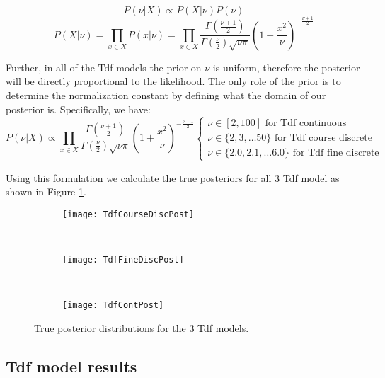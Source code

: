\[P(\nu|X) \propto P(X|\nu)P(\nu)\]
\[P(X|\nu) = \prod_{x \in X} P(x|\nu) = \prod_{x \in X} \frac{\Gamma \left( \frac{\nu+1}{2} \right)}{\Gamma \left( \frac{\nu}{2} \right) \sqrt{\nu \pi}} \left( 1 + \frac{x^2}{\nu} \right)^{-\frac{\nu+1}{2}} \]

Further, in all of the Tdf models the prior on $\nu$ is uniform, therefore the posterior will be directly proportional to the likelihood. The only role of the prior is to determine the normalization constant by defining what the domain of our posterior is. Specifically, we have:
\[P(\nu|X) \propto 
  \prod_{x \in X} \frac{\Gamma \left( \frac{\nu+1}{2} \right)}{\Gamma \left( \frac{\nu}{2} \right) \sqrt{\nu \pi}} \left( 1 + \frac{x^2}{\nu} \right)^{-\frac{\nu+1}{2}}
  \left\{
	  \begin{array}{lll}
		  \nu \in [2,100] \mbox{ for Tdf continuous} \\
		  \nu \in \{2, 3, \ldots 50\} \mbox{ for Tdf course discrete} \\
      \nu \in \{2.0, 2.1, \ldots 6.0\} \mbox{ for Tdf fine discrete}
	  \end{array}
  \right.\]


Using this formulation we calculate the true posteriors for all 3 Tdf model as shown in Figure \ref{fig:tdfPosts}.

\begin{figure}[h]
        \centering
        \begin{subfigure}[b]{0.31\textwidth}
                \centering
                \texttt{[image: TdfCourseDiscPost]}
        \end{subfigure}
        ~ 
        \begin{subfigure}[b]{0.31\textwidth}
                \centering
                \texttt{[image: TdfFineDiscPost]}
        \end{subfigure}
        ~ 
        \begin{subfigure}[b]{0.31\textwidth}
                \centering
                \texttt{[image: TdfContPost]}
        \end{subfigure}
    \caption{True posterior distributions for the 3 Tdf models.}
    \label{fig:tdfPosts}
\end{figure}

\subsection{Tdf model results}

